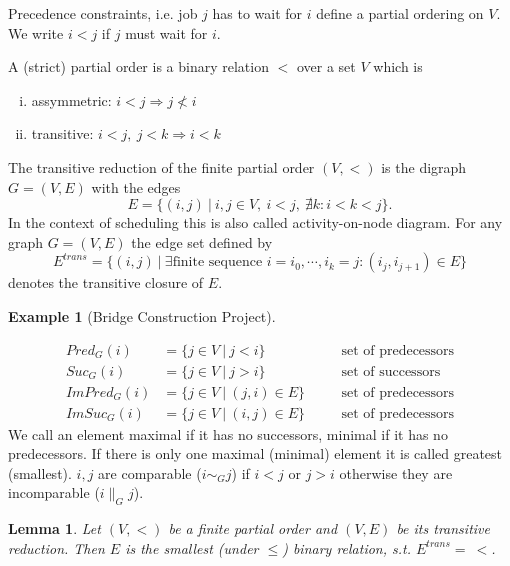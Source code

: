 \documentclass[11pt,a4paper,notitlepage]{article}
\theoremstyle{plain}
\newtheorem{lemma}[defn]{Lemma}
\theoremstyle{definition}
\newtheorem{ex}[defn]{Example}
\begin{document}
Precedence constraints, i.e. job $j$ has to wait for $i$ define a partial ordering on $V$. We write $i<j$ if $j$ must wait for $i$.

\begin{defn}
  A (strict) partial order is a binary relation $<$ over a set $V$ which is
  \begin{enumerate}[(i)]
    \item assymmetric: $i<j \Rightarrow j \not < i$
    \item transitive: $i<j,\ j<k \Rightarrow i < k$
  \end{enumerate}
\end{defn}

\begin{defn}
  The transitive reduction of the finite partial order $(V,<)$ is the digraph $G = (V,E)$ with the edges
  \[ E = \{(i,j)\ |\ i,j\in V,\ i<j,\ \nexists k: i < k < j\}. \]
  In the context of scheduling this is also called activity-on-node diagram. For any graph $G = (V,E)$ the edge set defined by
  \[ E^{trans} = \{(i,j)\ |\ \exists \text{finite sequence } i=i_{0},\cdots,i_{k} = j: (i_{j}, i_{j+1})\in E\}\]
  denotes the transitive closure of $E$.
\end{defn}

\begin{ex}[Bridge Construction Project]
\end{ex}

\begin{defn}
  \begin{align*}
    Pred_{G}(i) &= \{j\in V \ |\ j < i\}\quad &&\text{set of predecessors}\\
    Suc_{G}(i) &= \{j\in V \ |\ j > i\}\quad &&\text{set of successors}\\
    ImPred_{G}(i) &= \{j\in V \ |\ (j,i)\in E\}\quad &&\text{set of predecessors}\\
    ImSuc_{G}(i) &= \{j\in V \ |\ (i,j)\in E\}\quad &&\text{set of predecessors}
  \end{align*}
  We call an element maximal if it has no successors, minimal if it has no predecessors. If there is only one maximal (minimal) element it is called greatest (smallest). $i,j$ are comparable ($i \sim_{G} j$) if $i<j$ or $j>i$ otherwise they are incomparable ($i\parallel_{G} j$).
\end{defn}

\begin{lemma}
  \label{lemma:gen_rel}
  Let $(V,<)$ be a finite partial order and $(V,E)$ be its transitive reduction.
  Then $E$ is the smallest (under $\leq$) binary relation, s.t. $E^{trans} =\ <$.
\end{lemma}
\end{document}
